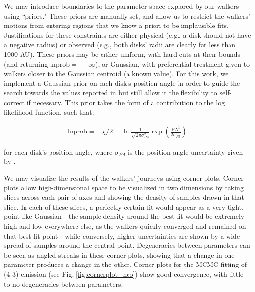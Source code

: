 We may introduce boundaries to the parameter space explored by our walkers using ``priors." These priors are manually set, and allow us to restrict the walkers' motions from entering regions that we know a priori to be implausible fits. Justifications for these constraints are either physical (e.g., a disk should not have a negative radius) or observed (e.g., both disks' radii are clearly far less than 1000 AU). These priors may be either uniform, with hard cuts at their bounds (and returning lnprob$ =\,-\infty$), or Gaussian, with preferential treatment given to walkers closer to the Gaussian centroid (a known value). For this work, we implement a Gaussian prior on each disk's position angle in order to guide the search towards the values reported in \citet{Williams2014} but still allow it the flexibility to self-correct if necessary. This prior takes the form of a contribution to the log likelihood function, such that:

\begin{align}
  \text{lnprob} = -\chi/2  -\ln{\frac{1}{\sqrt{2 \pi \sigma_{PA}^2}}} \exp{\left(\frac{\text{PA}^2}{2 \sigma_{PA}^2}\right)}
\end{align}

\noindent
for each disk's position angle, where $\sigma_{PA}$ is the position angle uncertainty given by \citet{Williams2014}.



We may visualize the results of the walkers' journeys using corner plots. Corner plots allow high-dimensional space to be visualized in two dimensions by taking slices across each pair of axes and showing the density of samples drawn in that slice. In each of these slices, a perfectly certain fit would appear as a very tight, point-like Gaussian - the sample density around the best fit would be extremely high and low everywhere else, as the walkers quickly converged and remained on that best fit point - while conversely, higher uncertainties are shown by a wide spread of samples around the central point. Degeneracies between parameters can be seen as angled streaks in these corner plots, showing that a change in one parameter produces a change in the other. Corner plots for the MCMC fitting of \hco(4-3) emission (see Fig. \ref{fig:cornerplot_hco}) show good convergence, with little to no degeneracies between parameters.


